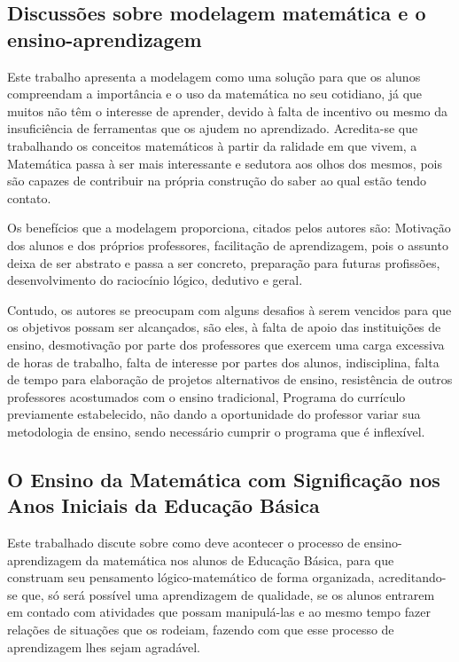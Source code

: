 \documentclass[12pt,a4paper]{article}
\begin{document}
\subsection{Discussões sobre modelagem matemática e o ensino-aprendizagem}
Este trabalho apresenta a modelagem como uma solução para que os alunos compreendam a importância e o uso da matemática no seu cotidiano, já que muitos não têm o interesse de aprender, devido à falta de incentivo ou mesmo da insuficiência de ferramentas que os ajudem no aprendizado. Acredita-se que trabalhando os conceitos matemáticos à partir da ralidade em que vivem, a Matemática passa à ser mais interessante e sedutora aos olhos dos mesmos, pois são capazes de contribuir na própria construção do saber ao qual estão tendo contato. 

Os benefícios que a modelagem proporciona, citados pelos autores são: Motivação dos alunos e dos próprios professores, facilitação de aprendizagem, pois o assunto deixa de ser abstrato e passa a ser concreto, preparação para futuras profissões, desenvolvimento do raciocínio lógico, dedutivo e geral. 

Contudo, os autores se preocupam com alguns desafios à serem vencidos para que os objetivos possam ser alcançados, são eles, à falta de apoio das instituições de ensino, desmotivação por parte dos professores que exercem uma carga excessiva de horas de trabalho, falta de interesse por partes dos alunos, indisciplina, falta de tempo para elaboração de projetos alternativos de ensino, resistência de outros professores acostumados com o ensino tradicional, Programa do currículo previamente estabelecido, não dando a oportunidade do professor variar sua metodologia de ensino, sendo necessário cumprir o programa que é inflexível. \citep{silveira2005discussoes} 

\subsection{O Ensino da Matemática com Significação nos Anos Iniciais da Educação Básica}
Este trabalhado discute sobre como deve acontecer o processo de ensino-aprendizagem da matemática nos alunos de Educação Básica, para que construam seu pensamento lógico-matemático de forma organizada, acreditando-se que, só será possível uma aprendizagem de qualidade, se os alunos entrarem em contado com atividades que possam manipulá-las e ao mesmo tempo fazer relações de situações que os rodeiam, fazendo com que esse processo de aprendizagem lhes sejam agradável. 
\end{document}
